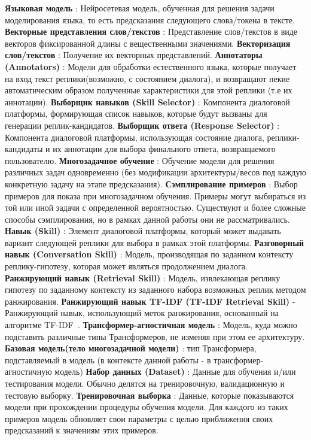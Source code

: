 \textbf{Языковая модель} : Нейросетевая модель, обученная для решения задачи моделирования языка, то есть предсказания следующего слова/токена в тексте.
\textbf{Векторные представления слов/текстов} : Представление слов/текстов в виде векторов фиксированной длины с вещественными значениями.
\textbf{Векторизация слов/текстов} : Получение их векторных представлений. 
\textbf{Аннотаторы (Annotators)} : Модели для обработки естественного языка, которые получает на вход текст реплики(возможно, с состоянием диалога), и возвращают некие автоматическим образом полученные характеристики для этой реплики (т.е их аннотации). 
\textbf{Выборщик навыков (Skill Selector)} : Компонента диалоговой платформы, формирующая список навыков, которые будут вызваны для генерации реплик-кандидатов.
\textbf{Выборщик ответа (Response Selector)} : Компонента диалоговой платформы, использующая состояние диалога, реплики-кандидаты и их аннотации для выбора финального ответа, возвращаемого пользователю.
\textbf{Многозадачное обучение} : Обучение модели для решения различных задач одновременно (без модификации архитектуры/весов под каждую конкретную задачу на этапе предсказания). 
\textbf{Сэмплирование примеров} : Выбор примеров для показа при многозадачном обучения. Примеры могут выбираться из той или иной задачи с определенной вероятностью. Существуют и более сложные способы сэмплирования, но в рамках данной работы они не рассматривались. 
\textbf{Навык (Skill)} : Элемент диалоговой платформы, который может выдавать вариант следующей реплики для выбора в рамках этой платформы. 
\textbf{Разговорный навык (Conversation Skill)} : Модель, производящая по заданном контексту реплику-гипотезу, которая может являться продолжением диалога.
\textbf{Ранжирующий навык (Retrieval Skill)} : Модель, извлекающая реплику гипотезу по заданному контексту из заданного набора возможных реплик методом ранжирования.
\textbf{Ранжирующий навык TF-IDF (TF-IDF Retrieval Skill)} - Ранжирующий навык, использующий меток ранжирования, основанный на алгоритме TF-IDF~\cite{tfidf}. 
\textbf{Трансформер-агностичная модель} : Модель, куда можно подставить различные типы Трансформеров, не  изменяя при этом ее архитектуру.
\textbf{Базовая модель(тело многозадачной модели)} : тип Трансформера, подставляемый в модель (в контексте данной работы - в трансформер-агностичную модель)
\textbf{Набор данных (Dataset)} : Данные для обучения и/или тестирования модели. Обычно делятся на тренировочную, валидационную и тестовую выборку. 
\textbf{Тренировочная выборка} : Данные, которые показываются модели при прохождении процедуры обучения модели. Для каждого из таких примеров модель обновляет свои параметры с целью приближения своих предсказаний к значениям этих примеров. 
